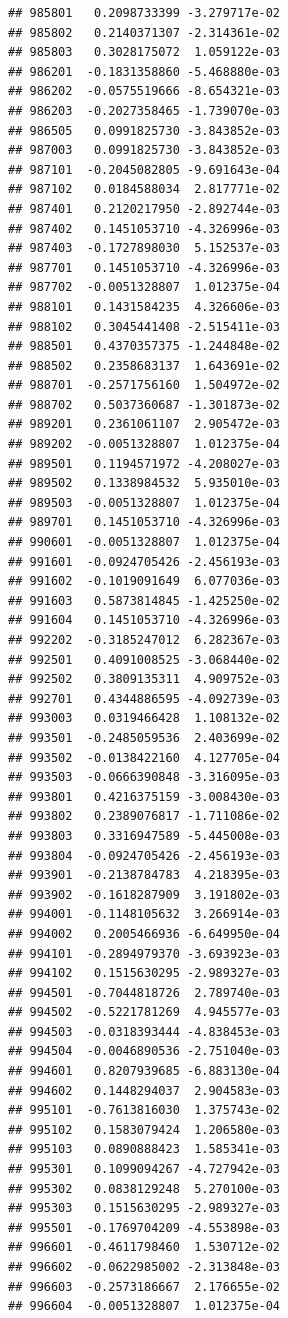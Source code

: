 \documentclass[ignorenonframetext,]{beamer}
\begin{document}
\begin{frame}[fragile]
\begin{verbatim}
## 985801   0.2098733399 -3.279717e-02
## 985802   0.2140371307 -2.314361e-02
## 985803   0.3028175072  1.059122e-03
## 986201  -0.1831358860 -5.468880e-03
## 986202  -0.0575519666 -8.654321e-03
## 986203  -0.2027358465 -1.739070e-03
## 986505   0.0991825730 -3.843852e-03
## 987003   0.0991825730 -3.843852e-03
## 987101  -0.2045082805 -9.691643e-04
## 987102   0.0184588034  2.817771e-02
## 987401   0.2120217950 -2.892744e-03
## 987402   0.1451053710 -4.326996e-03
## 987403  -0.1727898030  5.152537e-03
## 987701   0.1451053710 -4.326996e-03
## 987702  -0.0051328807  1.012375e-04
## 988101   0.1431584235  4.326606e-03
## 988102   0.3045441408 -2.515411e-03
## 988501   0.4370357375 -1.244848e-02
## 988502   0.2358683137  1.643691e-02
## 988701  -0.2571756160  1.504972e-02
## 988702   0.5037360687 -1.301873e-02
## 989201   0.2361061107  2.905472e-03
## 989202  -0.0051328807  1.012375e-04
## 989501   0.1194571972 -4.208027e-03
## 989502   0.1338984532  5.935010e-03
## 989503  -0.0051328807  1.012375e-04
## 989701   0.1451053710 -4.326996e-03
## 990601  -0.0051328807  1.012375e-04
## 991601  -0.0924705426 -2.456193e-03
## 991602  -0.1019091649  6.077036e-03
## 991603   0.5873814845 -1.425250e-02
## 991604   0.1451053710 -4.326996e-03
## 992202  -0.3185247012  6.282367e-03
## 992501   0.4091008525 -3.068440e-02
## 992502   0.3809135311  4.909752e-03
## 992701   0.4344886595 -4.092739e-03
## 993003   0.0319466428  1.108132e-02
## 993501  -0.2485059536  2.403699e-02
## 993502  -0.0138422160  4.127705e-04
## 993503  -0.0666390848 -3.316095e-03
## 993801   0.4216375159 -3.008430e-03
## 993802   0.2389076817 -1.711086e-02
## 993803   0.3316947589 -5.445008e-03
## 993804  -0.0924705426 -2.456193e-03
## 993901  -0.2138784783  4.218395e-03
## 993902  -0.1618287909  3.191802e-03
## 994001  -0.1148105632  3.266914e-03
## 994002   0.2005466936 -6.649950e-04
## 994101  -0.2894979370 -3.693923e-03
## 994102   0.1515630295 -2.989327e-03
## 994501  -0.7044818726  2.789740e-03
## 994502  -0.5221781269  4.945577e-03
## 994503  -0.0318393444 -4.838453e-03
## 994504  -0.0046890536 -2.751040e-03
## 994601   0.8207939685 -6.883130e-04
## 994602   0.1448294037  2.904583e-03
## 995101  -0.7613816030  1.375743e-02
## 995102   0.1583079424  1.206580e-03
## 995103   0.0890888423  1.585341e-03
## 995301   0.1099094267 -4.727942e-03
## 995302   0.0838129248  5.270100e-03
## 995303   0.1515630295 -2.989327e-03
## 995501  -0.1769704209 -4.553898e-03
## 996601  -0.4611798460  1.530712e-02
## 996602  -0.0622985002 -2.313848e-03
## 996603  -0.2573186667  2.176655e-02
## 996604  -0.0051328807  1.012375e-04

\end{verbatim}
\end{frame}
\end{document}
